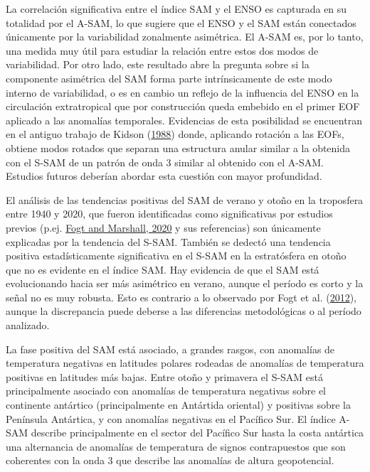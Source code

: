 \documentclass[12pt,oneside,a4paper]{reedthesis}
\begin{document}
La correlación significativa entre el índice SAM y el ENSO es capturada en su totalidad por el A-SAM, lo que sugiere que el ENSO y el SAM están conectados únicamente por la variabilidad zonalmente asimétrica.
El A-SAM es, por lo tanto, una medida muy útil para estudiar la relación entre estos dos modos de variabilidad.
Por otro lado, este resultado abre la pregunta sobre si la componente asimétrica del SAM forma parte intrínsicamente de este modo interno de variabilidad, o es en cambio un reflejo de la influencia del ENSO en la circulación extratropical que por construcción queda embebido en el primer EOF aplicado a las anomalías temporales.
Evidencias de esta posibilidad se encuentran en el antiguo trabajo de Kidson (\protect\hyperlink{ref-kidson1988}{1988}) donde, aplicando rotación a las EOFs, obtiene modos rotados que separan una estructura anular similar a la obtenida con el S-SAM de un patrón de onda 3 similar al obtenido con el A-SAM.
Estudios futuros deberían abordar esta cuestión con mayor profundidad.

El análisis de las tendencias positivas del SAM de verano y otoño en la troposfera entre 1940 y 2020, que fueron identificadas como significativas por estudios previos (p.ej. \protect\hyperlink{ref-fogt2020}{Fogt and Marshall, 2020} y sus referencias) son únicamente explicadas por la tendencia del S-SAM.
También se dedectó una tendencia positiva estadísticamente significativa en el S-SAM en la estratósfera en otoño que no es evidente en el índice SAM.
Hay evidencia de que el SAM está evolucionando hacia ser más asimétrico en verano, aunque el período es corto y la señal no es muy robusta.
Esto es contrario a lo observado por Fogt et al. (\protect\hyperlink{ref-fogt2012}{2012}), aunque la discrepancia puede deberse a las diferencias metodológicas o al período analizado.

La fase positiva del SAM está asociado, a grandes rasgos, con anomalías de temperatura negativas en latitudes polares rodeadas de anomalías de temperatura positivas en latitudes más bajas.
Entre otoño y primavera el S-SAM está principalmente asociado con anomalías de temperatura negativas sobre el continente antártico (principalmente en Antártida oriental) y positivas sobre la Península Antártica, y con anomalías negativas en el Pacífico Sur.
El índice A-SAM describe principalmente en el sector del Pacífico Sur hasta la costa antártica una alternancia de anomalías de temperatura de signos contrapuestos que son coherentes con la onda 3 que describe las anomalías de altura geopotencial.
\end{document}

